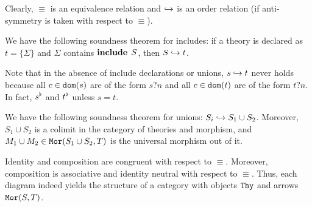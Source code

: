 Clearly, $\equiv$ is an equivalence relation and $\hookrightarrow$ is an order relation (if anti-symmetry is taken with respect to $\equiv$).

\begin{example}\label{rel:incl}
We have the following soundness theorem for includes: if a theory is declared as $t=\{\Sigma\}$ and $\Sigma$ contains $\operatorname{\mathbf{include}}{\;S}$, then $S\hookrightarrow t$.

Note that in the absence of include declarations or unions, $s\hookrightarrow t$ never holds because all $c\in\mathtt{dom}(s)$ are of the form $s?n$ and all $c\in\mathtt{dom}(t)$ are of the form $t?n$.
In fact, $s^\flat$ and $t^\flat$ unless $s=t$.
\end{example}

\begin{example}\label{rel:union}
We have the following soundness theorem for unions: $S_i\hookrightarrow S_1\cup S_2$.
Moreover, $S_1\cup S_2$ is a colimit in the category of theories and morphism, and $M_1\cup M_2\in\mathtt{Mor}(S_1\cup S_2,T)$ is the universal morphism out of it.
\end{example}

\begin{example}\label{rel:cat}
Identity and composition are congruent with respect to $\equiv$.
Moreover, composition is associative and identity neutral with respect to $\equiv$.
Thus, each diagram indeed yields the structure of a category with objects $\mathtt{Thy}$ and arrows $\mathtt{Mor}(S,T)$.
\end{example}
